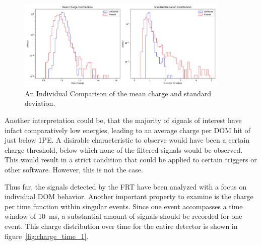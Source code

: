 \begin{figure}[H]
    \centering
    \includegraphics[width=0.9\textwidth]{Plots/qp_mean_std_comparison_histograms.png}
    \caption{An Individual Comparison of the mean charge and standard deviation.}
    \label{fig:mean_std_hist}
\end{figure}

Another interpretation could be, that the majority of signals of interest have infact comparatively low energies, leading to an average charge per DOM hit of 
just below \num{1}\unit{PE}. A disirable characteristic to observe would have been a certain charge threshold, below which none of the filtered signals 
would be observed. This would result in a strict condition that could be applied to certain triggers or other software. However, this is not the case. 


Thus far, the signals detected by the FRT have been analyzed with a focus on individual DOM behavior. Another important property to examine is the charge per 
time function within singular events. Since one event accompasses a time window of \SI{10}{\milli\second}, a substantial amount of signals should be 
recorded for one event. This charge distribution over time for the entire detector is shown in figure~\ref{fig:charge_time_1}.

